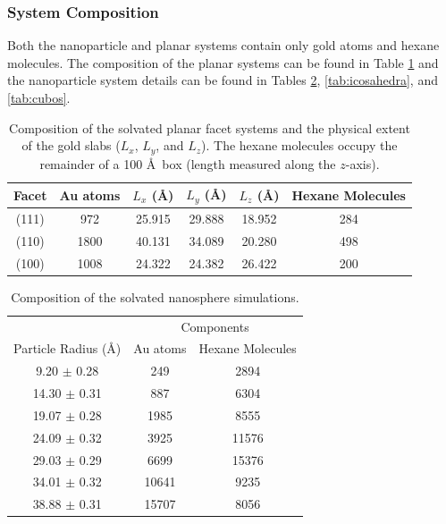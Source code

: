 \subsubsection{System Composition}
Both the nanoparticle and planar systems contain only gold atoms and
hexane molecules.  The composition of the planar systems can be found
in Table \ref{tab:facet} and the nanoparticle system details can be
found in Tables \ref{tab:spheres}, \ref{tab:icosahedra}, and \ref{tab:cubos}.

\begin{table}
\centering
\caption{Composition of the solvated planar facet systems and the
  physical extent of the gold slabs ($L_x$, $L_y$, and $L_z$). The
  hexane molecules occupy the remainder of a 100 \AA\ box (length
  measured along the $z$-axis).
  \label{tab:facet}}
\begin{tabular}{ c|cccc| c }
\toprule
Facet & Au atoms & $L_x$ (\AA) &$L_y$ (\AA) & $L_z$ (\AA) & Hexane Molecules\\
\midrule
(111) &  972 & 25.915   & 29.888 & 18.952 & 284      \\
(110) & 1800 & 40.131   & 34.089 & 20.280 & 498      \\
(100) & 1008 & 24.322   & 24.382 & 26.422 & 200      \\
\bottomrule
\end{tabular}
\end{table}

\begin{table}
\centering
\caption{Composition of the solvated nanosphere simulations.
  \label{tab:spheres}}
\begin{tabular}{ c|cc }
\toprule
        & \multicolumn{2}{c}{Components}\\
Particle Radius (\AA) & Au atoms & Hexane Molecules \\
\midrule
 9.20 $\pm$ 0.28  & 249   &  2894      \\
14.30 $\pm$ 0.31  & 887   &  6304      \\
19.07 $\pm$ 0.28  & 1985  &  8555      \\
24.09 $\pm$ 0.32  & 3925  & 11576      \\
29.03 $\pm$ 0.29  & 6699  & 15376      \\
34.01 $\pm$ 0.32  & 10641 &  9235      \\
38.88 $\pm$ 0.31  & 15707 &  8056      \\
\bottomrule
\end{tabular}
\end{table}

